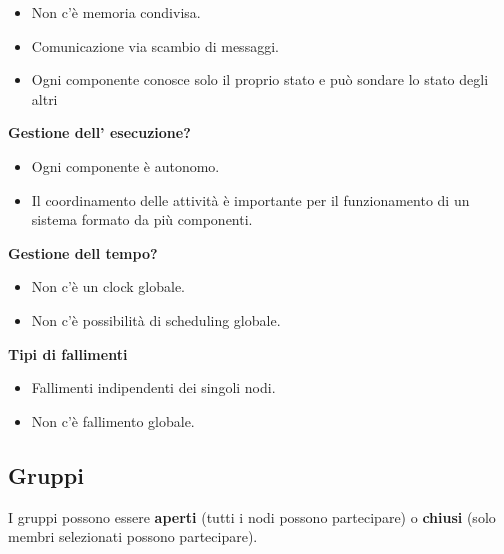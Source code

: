 \documentclass[12pt, a4paper]{article}
\begin{document}
    \begin{itemize}
        \item Non c'è memoria condivisa.
        \item Comunicazione via scambio di messaggi.
        \item Ogni componente conosce solo il proprio stato e può sondare lo stato degli altri
    \end{itemize}
    \textbf{Gestione dell' esecuzione?}
    \begin{itemize}
        \item Ogni componente è autonomo.
        \item Il coordinamento delle attività è importante per il funzionamento di un sistema
        formato da più componenti.
    \end{itemize}
    \textbf{Gestione dell tempo?}
    \begin{itemize}
        \item Non c'è un clock globale.
        \item Non c'è possibilità di scheduling globale.
    \end{itemize}
    \textbf{Tipi di fallimenti}
    \begin{itemize}
        \item Fallimenti indipendenti dei singoli nodi.
        \item Non c'è fallimento globale.
    \end{itemize}
    
    \subsection{Gruppi}
    I gruppi possono essere \textbf{aperti} (tutti i nodi possono partecipare)
    o \textbf{chiusi} (solo membri selezionati possono partecipare).
  
     
\end{document}
